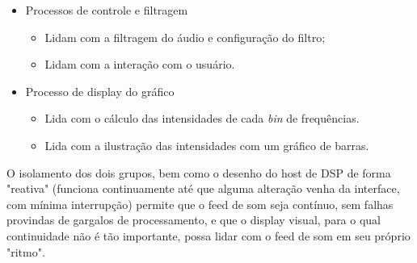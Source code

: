 \begin{multicols}{2}
    \begin{itemize}
        \item Processos de controle e filtragem
        \begin{itemize}
            \item Lidam com a filtragem do áudio e configuração do filtro;
            \item Lidam com a interação com o usuário.
        \end{itemize}
        \columnbreak
        \item Processo de display do gráfico
        \begin{itemize}
            \item Lida com o cálculo das intensidades de cada \textit{bin} de frequências.
            \item Lida com a ilustração das intensidades com um gráfico de barras.
        \end{itemize}
    \end{itemize}
\end{multicols}

O isolamento dos dois grupos, bem como o desenho do host de DSP de forma "reativa" (funciona continuamente até que alguma alteração venha da interface, com mínima interrupção) permite que o feed de som seja contínuo, sem falhas provindas de gargalos de processamento, e que o display visual, para o qual continuidade não é tão importante, possa lidar com o feed de som em seu próprio "ritmo".